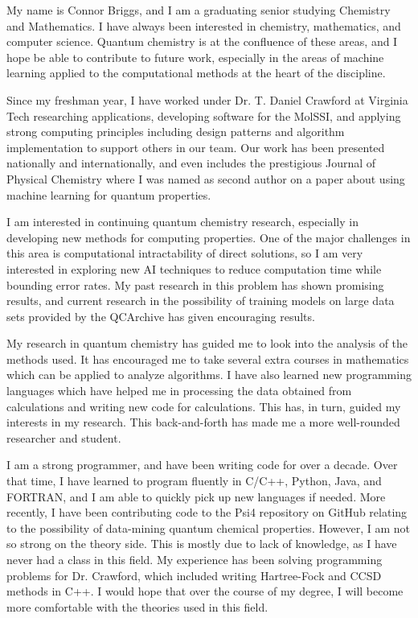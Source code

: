 \documentclass[12pt]{article}
\begin{document}
\noindent My name is Connor Briggs, and I am a graduating senior studying Chemistry and Mathematics.  I have always been interested in chemistry, mathematics, and computer science.  Quantum chemistry is at the confluence of these areas, and I hope be able to contribute to future work, especially in the areas of machine learning applied to the computational methods at the heart of the discipline.\par

Since my freshman year, I have worked under Dr. T. Daniel Crawford at Virginia Tech researching applications, developing software for the MolSSI, and applying strong computing principles including design patterns and algorithm implementation to support others in our team.  Our work has been presented nationally and internationally, and even includes the prestigious Journal of Physical Chemistry where I was named as second author on a paper about using machine learning for quantum properties.\par

I am interested in continuing quantum chemistry research, especially in developing new methods for computing properties.  One of the major challenges in this area is computational intractability of direct solutions, so I am very interested in exploring new AI techniques to reduce computation time while bounding error rates. My past research in this problem has shown promising results, and current research in the possibility of training models on large data sets provided by the QCArchive has given encouraging results.\par

My research in quantum chemistry has guided me to look into the analysis of the methods used. It has encouraged me to take several extra courses in mathematics which can be applied to analyze algorithms. I have also learned new programming languages which have helped me in processing the data obtained from calculations and writing new code for calculations. This has, in turn, guided my interests in my research. This back-and-forth has made me a more well-rounded researcher and student.\par

I am a strong programmer, and have been writing code for over a decade. Over that time, I have learned to program fluently in C/C++, Python, Java, and FORTRAN, and I am able to quickly pick up new languages if needed. More recently, I have been contributing code to the Psi4 repository on GitHub relating to the possibility of data-mining quantum chemical properties. However, I am not so strong on the theory side. This is mostly due to lack of knowledge, as I have never had a class in this field. My experience has been solving programming problems for Dr. Crawford, which included writing Hartree-Fock and CCSD methods in C++. I would hope that over the course of my degree, I will become more comfortable with the theories used in this field.\par
\end{document}
